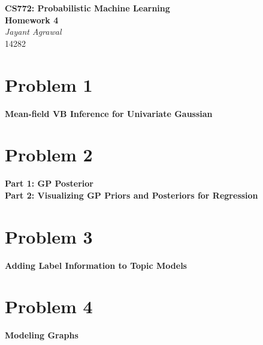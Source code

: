 \documentclass{article}
\begin{document}

\begin{center}
\textbf{\huge CS772: Probabilistic Machine Learning} \\
\textbf{\huge Homework 4} \\
\vspace{5pt}
\textit{\Large Jayant Agrawal} \\
14282
\end{center}

\section*{Problem 1}
\textbf{Mean-field VB Inference for Univariate Gaussian} \\


\section*{Problem 2}
\textbf{Part 1: GP Posterior} \\
\textbf{Part 2: Visualizing GP Priors and Posteriors for Regression} \\

\section*{Problem 3}
\textbf{Adding Label Information to Topic Models} \\


\section*{Problem 4}
\textbf{Modeling Graphs} \\
\end{document}
